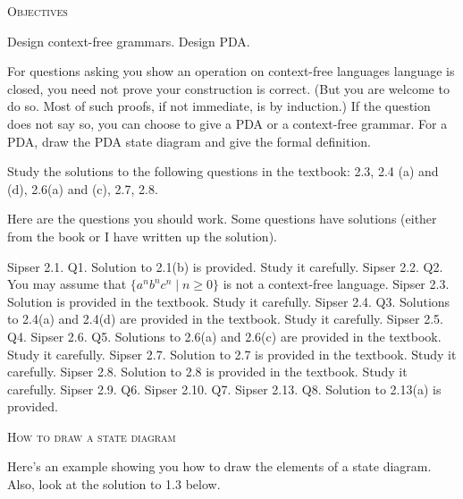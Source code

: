 

\renewcommand\AUTHOR{John Doe}


\topmatter

\textsc{Objectives}
\begin{itemize}
\li Design context-free grammars.
\li Design PDA.
\end{itemize}


For questions asking you show an operation on context-free languages
language is closed, you need not prove your construction is correct.
(But you are welcome to do so. Most of such proofs, if not immediate,
is by induction.)
If the question does not say so, you can choose to give a PDA or a
context-free grammar.
For a PDA, draw the PDA state diagram and give the formal definition.

Study the solutions to the following questions in the textbook:
2.3, 2.4 (a) and (d), 2.6(a) and (c), 2.7, 2.8.

Here are the questions you should work.
Some questions have solutions (either from
the book or I have written up the solution).
\begin{myenum}
\li Sipser 2.1. Q1. Solution to 2.1(b) is provided. Study it carefully. 
\li Sipser 2.2. Q2. You may assume that $\{a^nb^nc^n \mid n \geq 0\}$ is not a
context-free language.
\li Sipser 2.3. Solution is provided in the textbook. Study it carefully.
\li Sipser 2.4. Q3. Solutions to 2.4(a) and 2.4(d) are provided in the textbook.
Study it carefully.
\li Sipser 2.5. Q4.
\li Sipser 2.6. Q5. Solutions to 2.6(a) and 2.6(c) are provided in the textbook. Study it carefully.
\li Sipser 2.7. Solution to 2.7 is provided in the textbook. Study it carefully.
\li Sipser 2.8. Solution to 2.8 is provided in the textbook. Study it carefully.
\li Sipser 2.9. Q6.
\li Sipser 2.10. Q7.
\li Sipser 2.13. Q8. Solution to 2.13(a) is provided. 
\end{myenum}

\newpage
\textsc{How to draw a state diagram}

Here's an example showing you how to draw the elements of a state diagram.
Also, look at the solution to 1.3 below.

